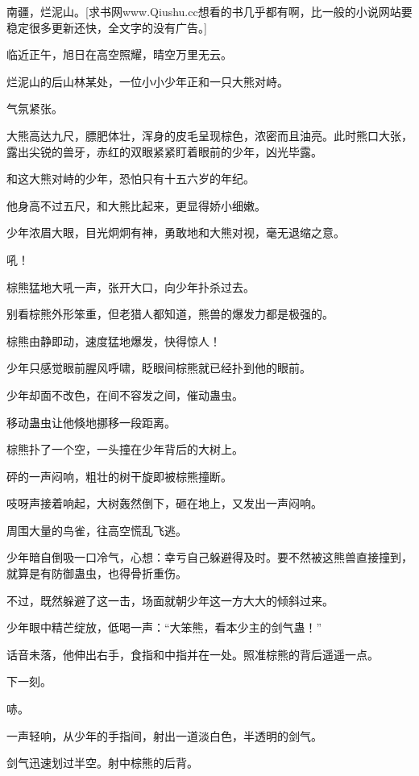 
\begin{this_body}

南疆，烂泥山。[求书网www.Qiushu.cc想看的书几乎都有啊，比一般的小说网站要稳定很多更新还快，全文字的没有广告。]

临近正午，旭日在高空照耀，晴空万里无云。

烂泥山的后山林某处，一位小小少年正和一只大熊对峙。

气氛紧张。

大熊高达九尺，膘肥体壮，浑身的皮毛呈现棕色，浓密而且油亮。此时熊口大张，露出尖锐的兽牙，赤红的双眼紧紧盯着眼前的少年，凶光毕露。

和这大熊对峙的少年，恐怕只有十五六岁的年纪。

他身高不过五尺，和大熊比起来，更显得娇小细嫩。

少年浓眉大眼，目光炯炯有神，勇敢地和大熊对视，毫无退缩之意。

吼！

棕熊猛地大吼一声，张开大口，向少年扑杀过去。

别看棕熊外形笨重，但老猎人都知道，熊兽的爆发力都是极强的。

棕熊由静即动，速度猛地爆发，快得惊人！

少年只感觉眼前腥风呼啸，眨眼间棕熊就已经扑到他的眼前。

少年却面不改色，在间不容发之间，催动蛊虫。

移动蛊虫让他倏地挪移一段距离。

棕熊扑了一个空，一头撞在少年背后的大树上。

砰的一声闷响，粗壮的树干旋即被棕熊撞断。

吱呀声接着响起，大树轰然倒下，砸在地上，又发出一声闷响。

周围大量的鸟雀，往高空慌乱飞逃。

少年暗自倒吸一口冷气，心想：幸亏自己躲避得及时。要不然被这熊兽直接撞到，就算是有防御蛊虫，也得骨折重伤。

不过，既然躲避了这一击，场面就朝少年这一方大大的倾斜过来。

少年眼中精芒绽放，低喝一声：“大笨熊，看本少主的剑气蛊！”

话音未落，他伸出右手，食指和中指并在一处。照准棕熊的背后遥遥一点。

下一刻。

哧。

一声轻响，从少年的手指间，射出一道淡白色，半透明的剑气。

剑气迅速划过半空。射中棕熊的后背。


\end{this_body}
